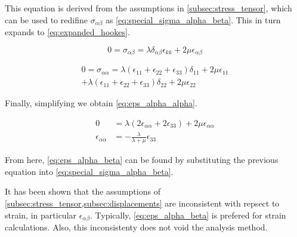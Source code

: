 This equation is derived from the assumptions in \cref{subsec:stress_tensor}, which can be used to redifine $\sigma_{\alpha \beta}$ as \cref{eq:special_sigma_alpha_beta}.
This in turn expands to \cref{eq:expanded_hookes}.

\begin{equation}
0 =\sigma_{\alpha\beta} =\lambda\delta_{\alpha\beta}\epsilon_{kk}+2\mu\epsilon_{\alpha\beta}
\label{eq:special_sigma_alpha_beta}
\end{equation}

\begin{align}
\label{eq:expanded_hookes}
0 = \sigma_{\alpha\alpha} = \lambda(\epsilon_{11}+\epsilon_{22}+\epsilon_{33})\delta_{11}+2\mu\epsilon_{11}\\
+ \lambda(\epsilon_{11}+\epsilon_{22}+\epsilon_{33})\delta_{22}+2\mu\epsilon_{22} \nonumber
\end{align}

Finally, simplifying we obtain \cref{eq:eps_alpha_alpha}.

\begin{align}
0 &=\lambda(2\epsilon_{\alpha\alpha} + 2\epsilon_{33})+2\mu\epsilon_{\alpha\alpha} \nonumber \\
\epsilon_{\alpha\alpha} &= -\frac{\lambda}{\lambda+\mu}\epsilon_{33}
\label{eq:eps_alpha_alpha}
\end{align}

From here, \cref{eq:eps_alpha_beta} can be found by substituting the previous equation into \cref{eq:special_sigma_alpha_beta}. 

It has been shown that the assumptions of \cref{subsec:stress_tensor,subsec:displacements} are inconsistent with repsect to strain, in particular $\epsilon_{\alpha\beta}$.
Typically, \cref{eq:eps_alpha_beta} is prefered for strain calculations.
Also, this inconsistenty does not void the analysis method.
